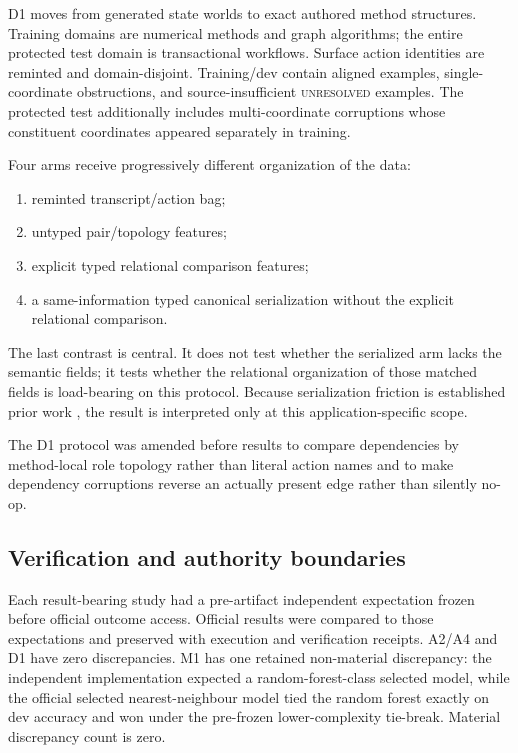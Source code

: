 \documentclass[10pt]{article}
\begin{document}
D1 moves from generated state worlds to exact authored method structures. Training domains are numerical methods and graph algorithms; the entire protected test domain is transactional workflows. Surface action identities are reminted and domain-disjoint. Training/dev contain aligned examples, single-coordinate obstructions, and source-insufficient \textsc{unresolved} examples. The protected test additionally includes multi-coordinate corruptions whose constituent coordinates appeared separately in training.

Four arms receive progressively different organization of the data:
\begin{enumerate}
    \item reminted transcript/action bag;
    \item untyped pair/topology features;
    \item explicit typed relational comparison features;
    \item a same-information typed canonical serialization without the explicit relational comparison.
\end{enumerate}
The last contrast is central. It does not test whether the serialized arm lacks the semantic fields; it tests whether the relational organization of those matched fields is load-bearing on this protocol. Because serialization friction is established prior work \citep{lo2026serialization}, the result is interpreted only at this application-specific scope.

The D1 protocol was amended before results to compare dependencies by method-local role topology rather than literal action names and to make dependency corruptions reverse an actually present edge rather than silently no-op.

\subsection{Verification and authority boundaries}

Each result-bearing study had a pre-artifact independent expectation frozen before official outcome access. Official results were compared to those expectations and preserved with execution and verification receipts. A2/A4 and D1 have zero discrepancies. M1 has one retained non-material discrepancy: the independent implementation expected a random-forest-class selected model, while the official selected nearest-neighbour model tied the random forest exactly on dev accuracy and won under the pre-frozen lower-complexity tie-break. Material discrepancy count is zero.
\end{document}
